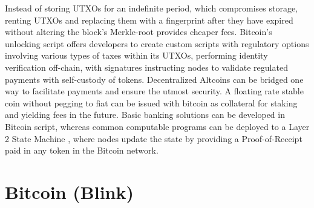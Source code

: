 \documentclass[a4paper,	10pt]{extarticle}
\begin{document}
Instead of storing UTXOs for an indefinite period, which compromises storage, renting UTXOs and replacing them with a fingerprint after they have expired without altering the block’s Merkle-root provides cheaper fees. Bitcoin’s unlocking script offers developers to create custom scripts with regulatory options involving various types of taxes within its UTXOs, performing identity verification off-chain, with signatures instructing nodes to validate regulated payments with self-custody of tokens. Decentralized Altcoins can be bridged one way to facilitate payments and ensure the utmost security. A floating rate stable coin \cite{stablecoin} without pegging to fiat can be issued with bitcoin as collateral for staking and yielding fees in the future. Basic banking solutions can be developed in Bitcoin script, whereas common computable programs can be deployed to a Layer 2 State Machine \cite{wood2014ethereum}, where nodes update the state by providing a Proof-of-Receipt paid in any token in the Bitcoin network.
\section{Bitcoin (Blink)} 
\end{document}
